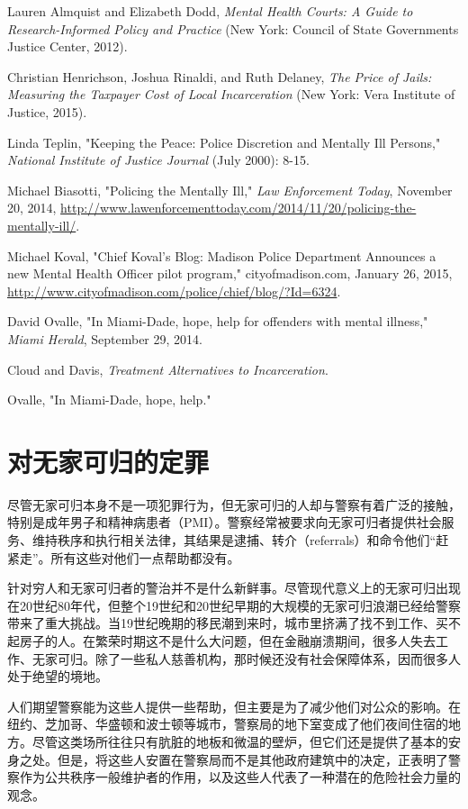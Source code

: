 \documentclass[fontset=fandol, a4paper, 12pt, openright]{ctexbook}
\begin{document}
\begin{enumerate}[label={[\arabic*]}]
    \item Lauren Almquist and Elizabeth Dodd, \textit{Mental Health Courts: A Guide to Research-Informed Policy and Practice} (New York: Council of State Governments Justice Center, 2012).
    \item Christian Henrichson, Joshua Rinaldi, and Ruth Delaney, \textit{The Price of Jails: Measuring the Taxpayer Cost of Local Incarceration} (New York: Vera Institute of Justice, 2015).
    \item Linda Teplin, "Keeping the Peace: Police Discretion and Mentally Ill Persons," \textit{National Institute of Justice Journal} (July 2000): 8-15.
    \item Michael Biasotti, "Policing the Mentally Ill," \textit{Law Enforcement Today}, November 20, 2014, \url{http://www.lawenforcementtoday.com/2014/11/20/policing-the-mentally-ill/}.
    \item Michael Koval, "Chief Koval's Blog: Madison Police Department Announces a new Mental Health Officer pilot program," cityofmadison.com, January 26, 2015, \url{http://www.cityofmadison.com/police/chief/blog/?Id=6324}.
    \item David Ovalle, "In Miami-Dade, hope, help for offenders with mental illness," \textit{Miami Herald}, September 29, 2014.
    \item Cloud and Davis, \textit{Treatment Alternatives to Incarceration}.
    \item Ovalle, "In Miami-Dade, hope, help."
\end{enumerate}

\chapter{对无家可归的定罪}

尽管无家可归本身不是一项犯罪行为，但无家可归的人却与警察有着广泛的接触，特别是成年男子和精神病患者（PMI）。警察经常被要求向无家可归者提供社会服务、维持秩序和执行相关法律，其结果是逮捕、转介（referrals）和命令他们“赶紧走”。所有这些对他们一点帮助都没有。

针对穷人和无家可归者的警治并不是什么新鲜事。尽管现代意义上的无家可归出现在20世纪80年代，但整个19世纪和20世纪早期的大规模的无家可归浪潮已经给警察带来了重大挑战。当19世纪晚期的移民潮到来时，城市里挤满了找不到工作、买不起房子的人。在繁荣时期这不是什么大问题，但在金融崩溃期间，很多人失去工作、无家可归。除了一些私人慈善机构，那时候还没有社会保障体系，因而很多人处于绝望的境地。

人们期望警察能为这些人提供一些帮助，但主要是为了减少他们对公众的影响。在纽约、芝加哥、华盛顿和波士顿等城市，警察局的地下室变成了他们夜间住宿的地方。尽管这类场所往往只有肮脏的地板和微温的壁炉，但它们还是提供了基本的安身之处。但是，将这些人安置在警察局而不是其他政府建筑中的决定，正表明了警察作为公共秩序一般维护者的作用，以及这些人代表了一种潜在的危险社会力量的观念。
\end{document}
